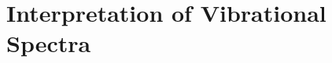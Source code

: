 \documentclass[11pt,DIV=13,BCOR=5mm,a4paper,headinclude]{scrbook}
\begin{document}
% 

\clearpage
\section{Interpretation of Vibrational Spectra}\label{sec:vib11-20}
\end{document}
